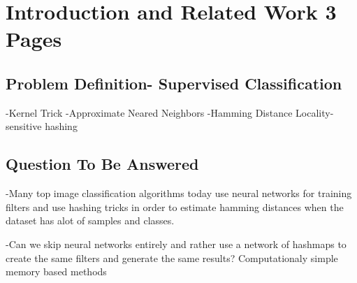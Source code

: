 \chapter{Introduction and Related Work 3 Pages}

\section{Problem Definition- Supervised Classification}

-Kernel Trick
-Approximate Neared Neighbors
-Hamming Distance
Locality-sensitive hashing

\section{Question To Be Answered} 

-Many top image classification algorithms today use neural networks for training filters and use hashing tricks in order to estimate hamming distances when the dataset has alot of samples and classes.

-Can we skip neural networks entirely and rather use a network of hashmaps to create the same filters and generate the same results? Computationaly simple memory based methods